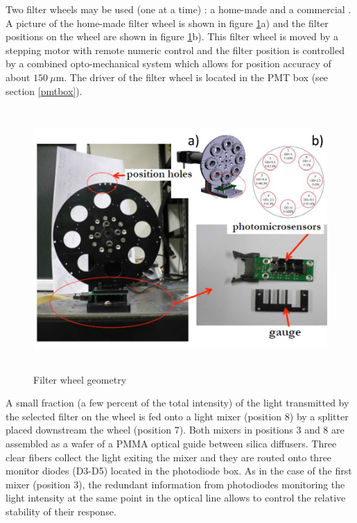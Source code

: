 Two filter wheels may be used (one at a time) : a home-made and a commercial \cite{ref:filterwheel}. A picture of the home-made filter wheel is shown in figure \ref{fig:x.3}a) and the filter
positions on the wheel are shown in figure \ref{fig:x.3}b). This filter wheel is
moved by a stepping motor with remote numeric control and the filter position is
controlled by a combined opto-mechanical system which allows for 
position accuracy of about  $150 ~\mu$m. The driver of the filter wheel is located
in the PMT box (see section \ref{pmtbox}).
% 
\begin{figure}[htb]
\begin{center} 
\includegraphics[height=10cm]{figures/Filter_wheel}
\caption{Filter wheel geometry
}\label{fig:x.3}
\end{center}
\end{figure}
%

 A small fraction (a few percent of the total intensity) of the light transmitted by
the selected filter on the wheel is fed onto a light mixer (position 8) by a
splitter placed downstream the wheel (position 7). Both mixers in positions 3 and 8
are assembled as a wafer of a PMMA optical guide between silica diffusers.
Three clear fibers collect the light exiting the mixer and they are routed onto
three monitor diodes (D3-D5) located in the photodiode box. As in the case of the
first mixer (position 3), the redundant information from photodiodes monitoring the
light intensity at the same point in the optical line allows to control the relative
stability of their response. 

